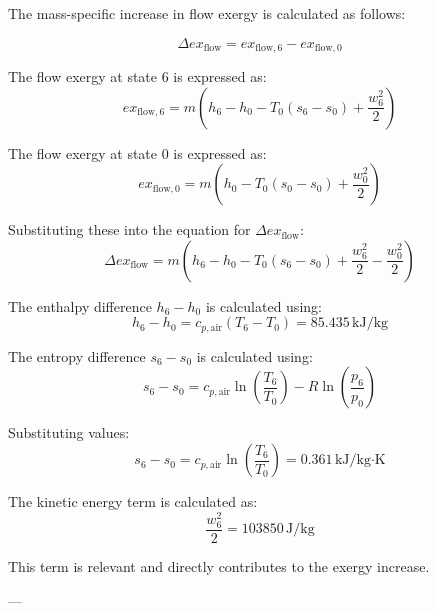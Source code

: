 The mass-specific increase in flow exergy is calculated as follows:  

\[
\Delta ex_{\text{flow}} = ex_{\text{flow},6} - ex_{\text{flow},0}
\]

The flow exergy at state 6 is expressed as:  
\[
ex_{\text{flow},6} = m \left( h_6 - h_0 - T_0 (s_6 - s_0) + \frac{w_6^2}{2} \right)
\]

The flow exergy at state 0 is expressed as:  
\[
ex_{\text{flow},0} = m \left( h_0 - T_0 (s_0 - s_0) + \frac{w_0^2}{2} \right)
\]

Substituting these into the equation for \(\Delta ex_{\text{flow}}\):  
\[
\Delta ex_{\text{flow}} = m \left( h_6 - h_0 - T_0 (s_6 - s_0) + \frac{w_6^2}{2} - \frac{w_0^2}{2} \right)
\]

The enthalpy difference \( h_6 - h_0 \) is calculated using:  
\[
h_6 - h_0 = c_{p,\text{air}} (T_6 - T_0) = 85.435 \, \text{kJ/kg}
\]

The entropy difference \( s_6 - s_0 \) is calculated using:  
\[
s_6 - s_0 = c_{p,\text{air}} \ln \left( \frac{T_6}{T_0} \right) - R \ln \left( \frac{p_6}{p_0} \right)
\]

Substituting values:  
\[
s_6 - s_0 = c_{p,\text{air}} \ln \left( \frac{T_6}{T_0} \right) = 0.361 \, \text{kJ/kg·K}
\]

The kinetic energy term is calculated as:  
\[
\frac{w_6^2}{2} = 103850 \, \text{J/kg}
\]

This term is relevant and directly contributes to the exergy increase.  

---